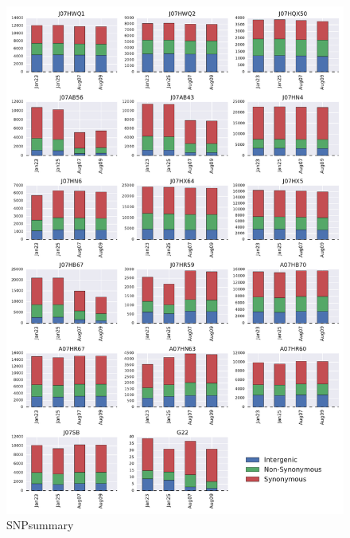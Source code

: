 \begin{figure}[!hbtp]
  \centering
  \includegraphics[width=\textwidth]{Chapter5/Figures/SNPsummary.pdf}
  \caption{SNPsummary}
  \label{SNPSummary}
\end{figure}

